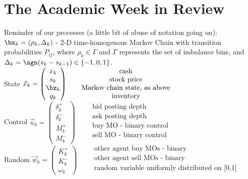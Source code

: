 \documentclass[12pt]{article}
\begin{document}
\newpage
\section*{The Academic Week in Review}
Reminder of our processes (a little bit of abuse of notation going on):\\
$\bz_k = (\rho_k, \Delta_k)$ - 2-D time-homogenous Markov Chain with transition probabilities $P_{ij}$, where $\rho_k \in \Gamma$ and $\Gamma$ represents the set of imbalance bins, and $\Delta_k = \sgn(s_k - s_{k-1}) \in \{-1,0,1\}$. \\
State $\vec{x}_{k} = \begin{pmatrix}
x_k \\
s_k \\
\bz_k \\
q_k 
\end{pmatrix} \qquad \begin{matrix}
\text{cash} \\
\text{stock price} \\
\text{Markov chain state, as above} \\
\text{inventory} \\
\end{matrix}$ \\
Control $\vec{u}_{k} = \begin{pmatrix}
\delta_k^+ \\
\delta_k^- \\
M_k^+ \\
M_k^-
\end{pmatrix} \qquad \begin{matrix}
\text{bid posting depth} \\
\text{ask posting depth} \\
\text{buy MO - binary control} \\
\text{sell MO - binary control} \\
\end{matrix}$ \\
Random $\vec{w}_{k} = \begin{pmatrix}
K_k^+ \\
K_k^- \\
\omega_k
\end{pmatrix} \qquad \begin{matrix}
\text{other agent buy MOs - binary} \\
\text{other agent sell MOs - binary} \\
\text{random variable uniformly distributed on [0,1]} \\
\end{matrix}$ \\
\end{document}
